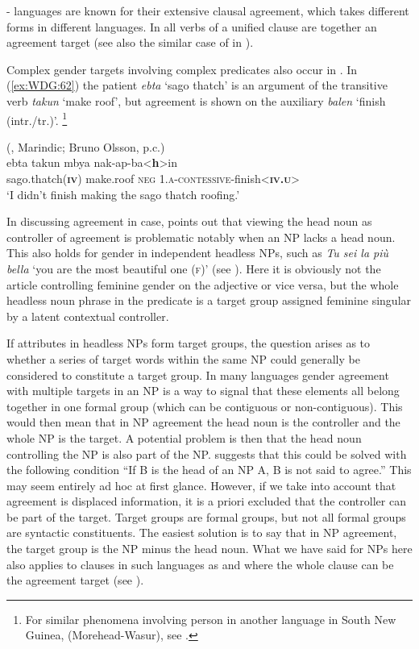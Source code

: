 \documentclass[output=collectionpaper]{langsci/langscibook}
\begin{document}
- languages are known for their extensive clausal agreement, which takes different forms in different languages. In  all verbs of a unified clause are together an agreement target (see also the similar case of  in ).

Complex gender targets involving complex predicates also occur in . In (\ref{ex:WDG:62}) the patient \textit{ebta} `sago thatch' is an argument of the transitive verb \textit{takun} `make roof', but agreement is shown on the auxiliary \textit{balen} `finish (intr./tr.)'.%
\footnote{%
For similar phenomena involving person in another language in South New Guinea,  (Morehead-Wasur), see \cite{Evans2015}.
} %

\ea\label{ex:WDG:62}
 (, Marindic; Bruno Olsson, p.c.)\\
\gll ebta	takun	mbya	nak-ap-ba<\textbf{h}>in	\\
sago.thatch(\textbf{\textsc{iv}})	make.roof	\textsc{neg}	1.\textsc{a-contessive}-finish<\textbf{\textsc{iv.u}}>\\
\glt `I didn't finish making the sago thatch roofing.'\\
\z

In discussing agreement in case, \cite[222]{Lehmann1982} points out that viewing the head noun as controller of agreement is problematic notably when an NP lacks a head noun. This also holds for gender in independent headless NPs, such as  \textit{Tu sei la più bella} `you are the most beautiful one (\textsc{f})' (see ). Here it is obviously not the article controlling feminine gender on the adjective or vice versa, but the whole headless noun phrase in the predicate is a target group assigned feminine singular by a latent contextual controller.

If attributes in headless NPs form target groups, the question arises as to whether a series of target words within the same NP could generally be considered to constitute a target group. In many languages gender agreement with multiple targets in an NP is a way to signal that these elements all belong together in one formal group (which can be contiguous or non-contiguous). This would then mean that in NP agreement the head noun is the controller and the whole NP is the target. A potential problem is then that the head noun controlling the NP is also part of the NP. \cite[223]{Lehmann1982} suggests that this could be solved with the following condition ``If B is the head of an NP A, B is not said to agree.'' This may seem entirely ad hoc at first glance. However, if we take into account that agreement is displaced information, it is a priori excluded that the controller can be part of the target. Target groups are formal groups, but not all formal groups are syntactic constituents. The easiest solution is to say that in NP agreement, the target group is the NP minus the head noun. What we have said for NPs here also applies to clauses in such  languages as  and  where the whole clause can be the agreement target (see ).
\end{document}
